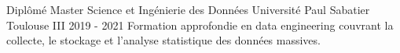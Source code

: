 


\begin{cventries}


\cventry
{Diplômé} %
{Master Science et Ingénierie des Données} %
{Université Paul Sabatier Toulouse III} %
{2019 - 2021} %
{Formation approfondie en data engineering couvrant la collecte, le stockage et l'analyse statistique des données massives.} %


\end{cventries}